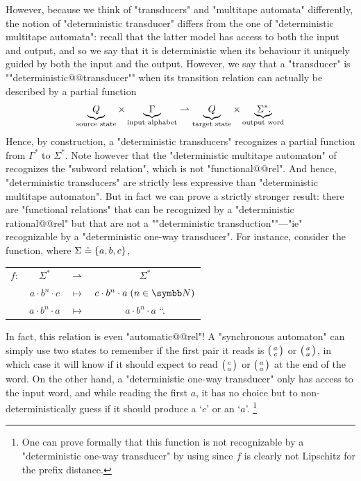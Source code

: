 However, because we think of "transducers" and "multitape automata" differently,
the notion of "deterministic transducer" differs from the one of
"deterministic multitape automata": recall that the latter model has access to both the input
and output, and so we say that it is deterministic when its behaviour it uniquely guided
by both the input and the output. However, we say that a "transducer" is
\AP""deterministic@@transducer"" when its transition relation can actually be described
by a partial function
\[
	\underbrace{Q}_{\text{source state}}
	\times \underbrace{\Gamma}_{\text{input alphabet}}
	\rightharpoonup
	\underbrace{Q}_{\text{target state}}
	\times \underbrace{{\Sigma^*}.\!}_{\text{output word}}
\]
Hence, by construction, a "deterministic transducers" recognizes a partial function
from $\Gamma^*$ to $\Sigma^*$.
Note however that the "deterministic multitape automaton" of 
recognizes the "subword relation", which is not "functional@@rel".
And hence, "deterministic transducers" are strictly less expressive
than "deterministic multitape automaton".
But in fact we can prove a strictly stronger result:
there are "functional relations" that can be recognized by
a "deterministic rational@@rel" but that are not a
\AP""deterministic transduction""---"ie" recognizable by a "deterministic one-way transducer".
For instance, consider the function, where $\Sigma \mathrel{\hat{=}} \{a,b,c\}$,
\begin{center}
	\begin{tabular}{rccc}
		$f\colon$ & $\Sigma^*$ & $\rightharpoonup$ & $\Sigma^*$ \\
		& $a\cdot b^n \cdot c$ & $\mapsto$ & $c \cdot b^n \cdot a \;(n\in\N)$ \\
		& $a\cdot b^n \cdot a$ & $\mapsto$ & $a \cdot b^n \cdot a$ \qquad``\quad.
	\end{tabular}
\end{center}
In fact, this relation is even "automatic@@rel"! A "synchronous automaton"
can simply use two states to remember if the first pair it reads is
$\pair{a}{c}$ or $\pair{a}{a}$, in which case it will know if it should expect
to read $\pair{c}{a}$ or $\pair{a}{a}$ at the end of the word.
On the other hand, a "deterministic one-way transducer"
only has access to the input word, and while reading the first $a$, it has no choice
but to non-deterministically guess if it should produce a `$c$' or an `$a$'.%
\footnote{One can prove formally that this function is
not recognizable by a "deterministic one-way transducer"
by using \cite[Theorem~V.4.2]{Sakarovitch2009Elements}
since $f$ is clearly not Lipschitz for the prefix distance.}

